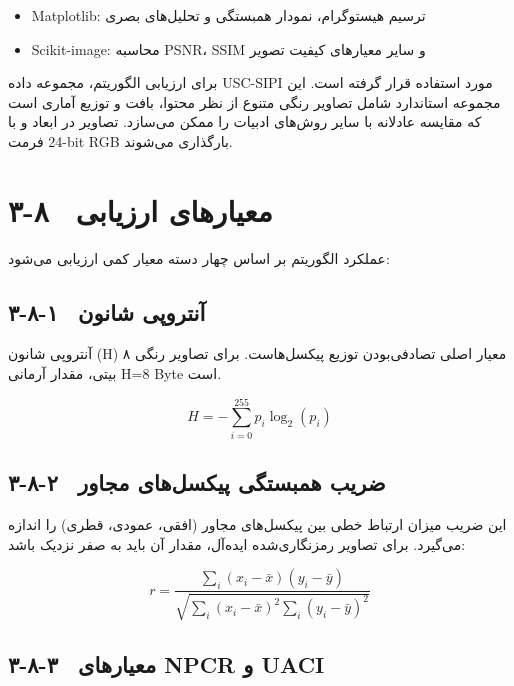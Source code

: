 \begin{itemize}
    \item ‎Matplotlib‎:  ترسیم هیستوگرام، نمودار همبستگی و تحلیل‌های بصری
\end{itemize}

\begin{itemize}
    \item ‎Scikit-image‎:  محاسبه ‎PSNR‎، ‎SSIM‎ و سایر معیارهای کیفیت تصویر
\end{itemize}

برای ارزیابی الگوریتم، مجموعه داده ‎USC-SIPI‎ مورد استفاده قرار گرفته است. این مجموعه استاندارد شامل تصاویر رنگی متنوع از نظر محتوا، بافت و توزیع آماری است که مقایسه عادلانه با سایر روش‌های ادبیات را ممکن می‌سازد. تصاویر در ابعاد  و  با فرمت ‎24-bit‎ ‎RGB‎ بارگذاری می‌شوند\cite{ref3, ref4, ref9}.

\section{۳-۸  معیارهای ارزیابی}

عملکرد الگوریتم بر اساس چهار دسته معیار کمی ارزیابی می‌شود:

\subsection{۳-۸-۱  آنتروپی شانون}

آنتروپی شانون (‎H‎) معیار اصلی تصادفی‌بودن توزیع پیکسل‌هاست. برای تصاویر رنگی ۸ بیتی، مقدار آرمانی     ‎H=8‎ ‎Byte‎  است.

\begin{equation}
H = -\sum_{i=0}^{255} p_i \log_2(p_i)
\label{eq:ch3-entropy}
\end{equation}

\subsection{۳-۸-۲  ضریب همبستگی پیکسل‌های مجاور}

این ضریب میزان ارتباط خطی بین پیکسل‌های مجاور (افقی، عمودی، قطری) را اندازه می‌گیرد. برای تصاویر رمزنگاری‌شده ایده‌آل، مقدار آن باید به صفر نزدیک باشد:

\begin{equation}
r = \frac{\sum_i (x_i - \bar{x})(y_i - \bar{y})}{\sqrt{\sum_i (x_i-\bar{x})^2 \sum_i (y_i-\bar{y})^2}}
\label{eq:ch3-corr}
\end{equation}

\subsection{۳-۸-۳  معیارهای ‎NPCR‎ و ‎UACI‎}

